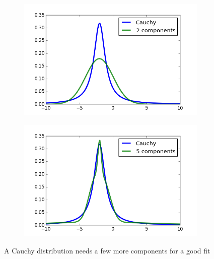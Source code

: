 \documentclass[11pt,a4paper]{book}
\begin{document}
\begin{figure}[h]
  \centering
  \begin{subfigure}{0.45\textwidth}
    \centering
    \includegraphics[width=\textwidth]{thesis/em/cauchy-2-components}
  \end{subfigure}
  \hfill
  \begin{subfigure}{0.45\textwidth}
    \centering
    \includegraphics[width=\textwidth]{thesis/em/cauchy-5-components}
  \end{subfigure}
  \caption{A Cauchy distribution needs a few more components for a good fit}
  \label{fig:em-cauchy}
\end{figure}
\end{document}
